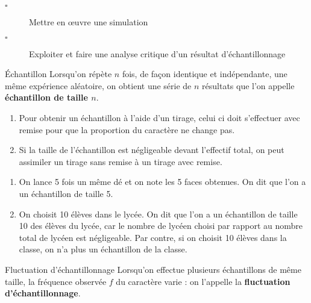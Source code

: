 \begin{titre}[Probabilités]

\end{titre}


\begin{CpsCol}
\begin{description}
\item[$\square$] Mettre en œuvre une simulation
\item[$\square$] Exploiter et faire une analyse critique d'un résultat d'échantillonnage
\end{description}
\end{CpsCol}



\begin{DefT}{Échantillon}
Lorsqu'on répète $n$ fois, de façon identique et indépendante, une même expérience aléatoire, on obtient une série
de $n$ résultats que l'on appelle \textbf{échantillon de taille $n$}.
\end{DefT}

\begin{Rq}
\begin{enumerate}
\item Pour obtenir un échantillon à l'aide d'un tirage, celui ci doit s'effectuer avec remise pour que la
proportion du caractère ne change pas.
\item Si la taille de l'échantillon est négligeable devant l'effectif total, on peut assimiler un tirage sans
remise à un tirage avec remise.
\end{enumerate}
\end{Rq}



\begin{Ex}
\begin{enumerate}
\item  On lance 5 fois un même dé et on note les 5 faces obtenues. On dit que l'on a un échantillon de
taille 5.
\item On choisit 10 élèves dans le lycée. On dit que l'on a un échantillon de taille 10 des élèves du lycée, car le nombre de
lycéen choisi par rapport au nombre total de lycéen est négligeable. Par contre, si on choisit 10 élèves
dans la classe, on n'a plus un échantillon de la classe.
\end{enumerate}
\end{Ex}

\begin{DefT}{Fluctuation d'échantillonnage}
Lorsqu'on effectue plusieurs échantillons de même taille, la fréquence observée $f$ du caractère
varie : on l'appelle la \textbf{fluctuation d'échantillonnage}.
\end{DefT}


